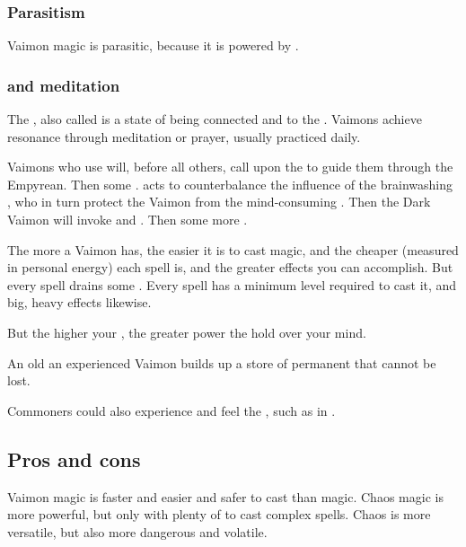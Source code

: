 \subsubsection{Parasitism}
Vaimon magic is parasitic, because it is powered by . 





\subsubsection{\Shechinah{} and meditation}
\index{\shechinah}
The \shechinah, also called  is a state of being connected and  to the \Archons. 
Vaimons achieve resonance through meditation or prayer, usually practiced daily. 

Vaimons who use \Itzach{} will, before all others, call upon the \qliphah{}  to guide them through the Empyrean. 
Then some \sephiroth. 
\KorRashad{} acts to counterbalance the influence of the brainwashing \sephiroth{}, who in turn protect the Vaimon from the mind-consuming \qliphoth. 
Then the Dark Vaimon will invoke  and . 
Then some more \Archons. 

The more \shechinah{} a Vaimon has, the easier it is to cast magic, and the cheaper (measured in personal energy) each spell is, and the greater effects you can accomplish. 
But every spell drains some \shechinah. 
Every spell has a minimum \shechinah{} level required to cast it, and big, heavy effects likewise. 

But the higher your \shechinah{}, the greater power the \Archons{} hold over your mind. 

An old an experienced Vaimon builds up a store of permanent \shechinah{} that cannot be lost. 

Commoners could also experience and feel the \shechinah, such as in . 









\subsection{Pros and cons}
Vaimon magic is faster and easier and safer to cast than \rethyactic{} magic. 
Chaos magic is more powerful, but only with plenty of  to cast complex spells. 
Chaos is more versatile, but also more dangerous and volatile. 

